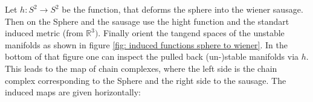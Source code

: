 \begin{example}
	Let $h:S^2 \to S^2$ be the function, that deforms the sphere into the wiener sausage. Then on the Sphere and the sausage use the hight function and the standart induced metric (from $\mathbb{R}^3)$. Finally orient the tangend spaces of the unstable manifolds as shown in figure \ref{fig: induced functions sphere to wiener}. In the bottom of that figure one can inspect the pulled back (un-)stable manifolds via $h$. This leads to the map of chain complexes, where the left side is the chain complex corresponding to the Sphere and the right side to the sausage. The induced maps are given horizontally: 
	\begin{center}
	\end{center}
\end{example}
